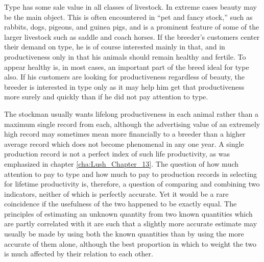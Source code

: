 Type has some sale value in all classes of livestock. In extreme cases
beauty may be the main object. This is often encountered in ``pet and
fancy stock,'' such as rabbits, dogs, pigeons, and guinea pigs, and is a
prominent feature of some of the larger livestock such as saddle and
coach horses. If the breeder's customers center their demand on type, he
is of course interested mainly in that, and in productiveness only in
that his animals should remain healthy and fertile. To appear healthy
is, in most cases, an important part of the breed ideal for type also. If
his customers are looking for productiveness regardless of beauty, the
breeder is interested in type only as it may help him get that productiveness
more surely and quickly than if he did not pay attention to
type.

The stockman usually wants lifelong productiveness in each animal
rather than a maximum single record from each, although the advertising
value of an extremely high record may sometimes mean more financially
to a breeder than a higher average record which does not become
phenomenal in any one year. A single production record is not a perfect
index of such life productivity, as was emphasized in chapter \ref{cha:Lush_Chapter_13}. The
question of how much attention to pay to type and how much to pay to
production records in selecting for lifetime productivity is, therefore, a
question of comparing and combining two indicators, neither of which
is perfectly accurate. Yet it would be a rare coincidence if the usefulness
of the two happened to be exactly equal. The principles of estimating
an unknown quantity from two known quantities which are partly
correlated with it are such that a slightly more accurate estimate may
usually be made by using both the known quantities than by using the
more accurate of them alone, although the best proportion in which to
weight the two is much affected by their relation to each other.

